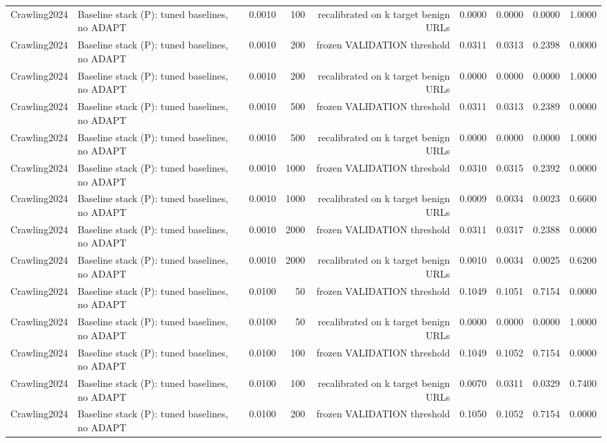 \begin{table}[t]
\begin{tabular}{llrrrrrrr}
Crawling2024 & Baseline stack (P): tuned baselines, no ADAPT & 0.0010 & 100 & recalibrated on k target benign URLs & 0.0000 & 0.0000 & 0.0000 & 1.0000 \\
Crawling2024 & Baseline stack (P): tuned baselines, no ADAPT & 0.0010 & 200 & frozen VALIDATION threshold & 0.0311 & 0.0313 & 0.2398 & 0.0000 \\
Crawling2024 & Baseline stack (P): tuned baselines, no ADAPT & 0.0010 & 200 & recalibrated on k target benign URLs & 0.0000 & 0.0000 & 0.0000 & 1.0000 \\
Crawling2024 & Baseline stack (P): tuned baselines, no ADAPT & 0.0010 & 500 & frozen VALIDATION threshold & 0.0311 & 0.0313 & 0.2389 & 0.0000 \\
Crawling2024 & Baseline stack (P): tuned baselines, no ADAPT & 0.0010 & 500 & recalibrated on k target benign URLs & 0.0000 & 0.0000 & 0.0000 & 1.0000 \\
Crawling2024 & Baseline stack (P): tuned baselines, no ADAPT & 0.0010 & 1000 & frozen VALIDATION threshold & 0.0310 & 0.0315 & 0.2392 & 0.0000 \\
Crawling2024 & Baseline stack (P): tuned baselines, no ADAPT & 0.0010 & 1000 & recalibrated on k target benign URLs & 0.0009 & 0.0034 & 0.0023 & 0.6600 \\
Crawling2024 & Baseline stack (P): tuned baselines, no ADAPT & 0.0010 & 2000 & frozen VALIDATION threshold & 0.0311 & 0.0317 & 0.2388 & 0.0000 \\
Crawling2024 & Baseline stack (P): tuned baselines, no ADAPT & 0.0010 & 2000 & recalibrated on k target benign URLs & 0.0010 & 0.0034 & 0.0025 & 0.6200 \\
Crawling2024 & Baseline stack (P): tuned baselines, no ADAPT & 0.0100 & 50 & frozen VALIDATION threshold & 0.1049 & 0.1051 & 0.7154 & 0.0000 \\
Crawling2024 & Baseline stack (P): tuned baselines, no ADAPT & 0.0100 & 50 & recalibrated on k target benign URLs & 0.0000 & 0.0000 & 0.0000 & 1.0000 \\
Crawling2024 & Baseline stack (P): tuned baselines, no ADAPT & 0.0100 & 100 & frozen VALIDATION threshold & 0.1049 & 0.1052 & 0.7154 & 0.0000 \\
Crawling2024 & Baseline stack (P): tuned baselines, no ADAPT & 0.0100 & 100 & recalibrated on k target benign URLs & 0.0070 & 0.0311 & 0.0329 & 0.7400 \\
Crawling2024 & Baseline stack (P): tuned baselines, no ADAPT & 0.0100 & 200 & frozen VALIDATION threshold & 0.1050 & 0.1052 & 0.7154 & 0.0000 \\

\end{tabular}
\end{table}

